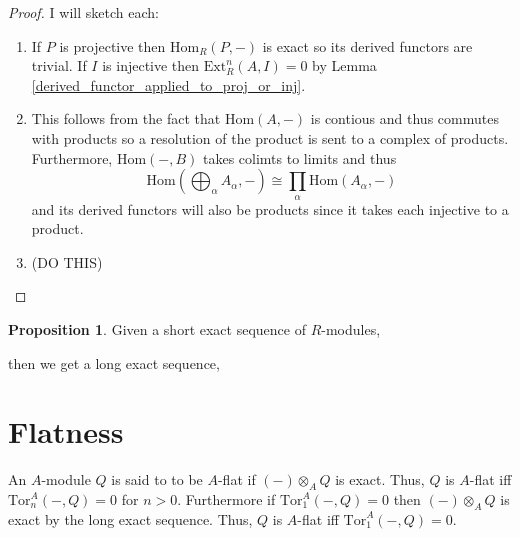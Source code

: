 \documentclass[12pt]{article}
\newcommand{\Tor}[4]{\mathrm{Tor}^{#1}_{#2} \left( #3, #4 \right)}
\newcommand{\Ext}[4]{\mathrm{Ext}^{#1}_{#2} \left( #3, #4 \right)}
\newcommand{\Homover}[3]{\mathrm{Hom}_{#1} \left( #2, #3 \right)}
\newcommand{\Hom}[2]{\mathrm{Hom}\left(#1, #2 \right)}
\theoremstyle{remark}
\theoremstyle{definition}
\newtheorem{proposition}[theorem]{Proposition}
\newenvironment{definition}[1][Definition:]{\begin{trivlist}
\item[\hskip \labelsep {\bfseries #1}]}{\end{trivlist}}
\begin{document}
\begin{proof}
I will sketch each:
\begin{enumerate}
\item If $P$ is projective then $\Homover{R}{P}{-}$ is exact so its derived functors are trivial. If $I$ is injective then $\Ext{n}{R}{A}{I} = 0$ by Lemma \ref{derived_functor_applied_to_proj_or_inj}.

\item This follows from the fact that $\Hom{A}{-}$ is contious and thus commutes with products so a resolution of the product is sent to a complex of products. Furthermore, $\Hom{-}{B}$ takes colimts to limits and thus 
\[ \Hom{\bigoplus_{\alpha} A_{\alpha}}{-} \cong \prod_{\alpha} \Hom{A_{\alpha}}{-} \]
and its derived functors will also be products since it takes each injective to a product. 

\item (DO THIS)
\end{enumerate} 
\end{proof}

\begin{proposition}
Given a short exact sequence of $R$-modules,
\begin{center}
\end{center}
then we get a long exact sequence,
\begin{center}
\end{center} 
\end{proposition}

\section{Flatness}

\begin{definition}
An $A$-module $Q$ is said to to be $A$-flat if $(-) \otimes_A Q$ is exact. Thus, $Q$ is $A$-flat iff $\Tor{A}{n}{-}{Q} = 0$ for $n > 0$. Furthermore if $\Tor{A}{1}{-}{Q} = 0$ then $(-) \otimes_A Q$ is exact by the long exact sequence. Thus, $Q$ is $A$-flat iff $\Tor{A}{1}{-}{Q} = 0$.   
\end{definition}
\end{document}
